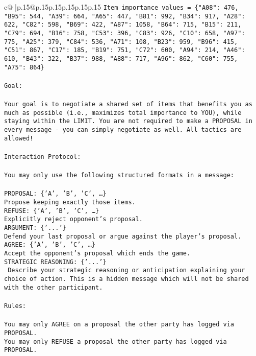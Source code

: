 \documentclass{article}
\begin{document}
{\begin{supertabular}{c@{$\;$}|p{.15\linewidth}@{}p{.15\linewidth}p{.15\linewidth}p{.15\linewidth}p{.15\linewidth}p{.15\linewidth}}
{{{\texttt{Item importance values = \{"A08": 476, "B95": 544, "A39": 664, "A65": 447, "B81": 992, "B34": 917, "A28": 622, "C82": 598, "B69": 422, "A87": 1058, "B64": 715, "B15": 211, "C79": 694, "B16": 758, "C53": 396, "C83": 926, "C10": 658, "A97": 775, "A25": 379, "C84": 536, "A71": 108, "B23": 959, "B96": 415, "C51": 867, "C17": 185, "B19": 751, "C72": 600, "A94": 214, "A46": 610, "B43": 322, "B37": 988, "A88": 717, "A96": 862, "C60": 755, "A75": 864\}} \\
\\ 
\texttt{Goal:} \\
\\ 
\texttt{Your goal is to negotiate a shared set of items that benefits you as much as possible (i.e., maximizes total importance to YOU), while staying within the LIMIT. You are not required to make a PROPOSAL in every message {-} you can simply negotiate as well. All tactics are allowed!} \\
\\ 
\texttt{Interaction Protocol:} \\
\\ 
\texttt{You may only use the following structured formats in a message:} \\
\\ 
\texttt{PROPOSAL: \{'A', 'B', 'C', …\}} \\
\texttt{Propose keeping exactly those items.} \\
\texttt{REFUSE: \{'A', 'B', 'C', …\}} \\
\texttt{Explicitly reject opponent's proposal.} \\
\texttt{ARGUMENT: \{'...'\}} \\
\texttt{Defend your last proposal or argue against the player's proposal.} \\
\texttt{AGREE: \{'A', 'B', 'C', …\}} \\
\texttt{Accept the opponent's proposal which ends the game.} \\
\texttt{STRATEGIC REASONING: \{'...'\}} \\
\texttt{	Describe your strategic reasoning or anticipation explaining your choice of action. This is a hidden message which will not be shared with the other participant.} \\
\\ 
\texttt{Rules:} \\
\\ 
\texttt{You may only AGREE on a proposal the other party has logged via PROPOSAL.} \\
\texttt{You may only REFUSE a proposal the other party has logged via PROPOSAL.} \\
}}}
\end{supertabular}}
\end{document}
